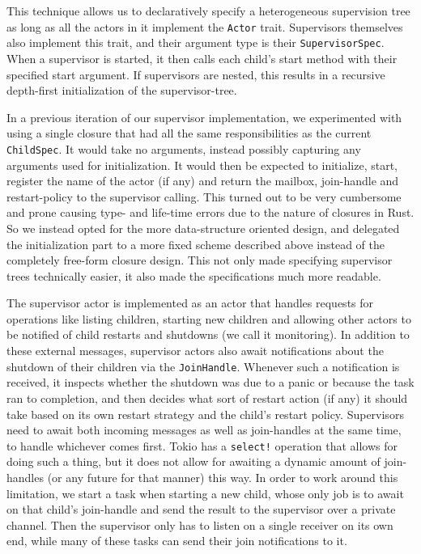 \documentclass[a4paper]{article}
\begin{document}
\begin{itemize}
This technique allows us to declaratively specify a heterogeneous supervision
tree as long as all the actors in it implement the \texttt{Actor} trait.
Supervisors themselves also implement this trait, and their argument type is
their \texttt{SupervisorSpec}. When a supervisor is started, it then calls each
child's start method with their specified start argument. If supervisors are
nested, this results in a recursive depth-first initialization of the
supervisor-tree.

In a previous iteration of our supervisor implementation, we experimented with
using a single closure that had all the same responsibilities as the current
\texttt{ChildSpec}. It would take no arguments, instead possibly capturing any
arguments used for initialization. It would then be expected to
initialize, start, register the name of the actor (if any) and return the
mailbox, join-handle and restart-policy to the supervisor calling. This turned
out to be very cumbersome and prone causing type- and life-time errors due to
the nature of closures in Rust. So we instead opted for the more data-structure
oriented design, and delegated the initialization part to a more fixed scheme
described above instead of the completely free-form closure design. This not
only made specifying supervisor trees technically easier, it also made the
specifications much more readable.

The supervisor actor is implemented as an actor that handles
requests for operations like listing children, starting new children and
allowing other actors to be notified of child restarts and shutdowns (we call it
monitoring). In addition to these external messages, supervisor actors also
await notifications about the shutdown of their children via the
\texttt{JoinHandle}. Whenever such a notification is received, it inspects
whether the shutdown was due to a panic or because the task ran to completion,
and then decides what sort of restart action (if any) it should take based on
its own restart strategy and the child's restart policy. Supervisors need to
await both incoming messages as well as join-handles at the same time, to handle
whichever comes first. Tokio has a \texttt{select!} operation that allows for
doing such a thing, but it does not allow for awaiting a dynamic amount of
join-handles (or any future for that manner) this way. In order to work
around this limitation, we start a task when starting a new child, whose only
job is to await on that child's join-handle and send the result to the
supervisor over a private channel. Then the supervisor only has to listen on a
single receiver on its own end, while many of these tasks can send their join
notifications to it.


\end{itemize}
\end{document}
